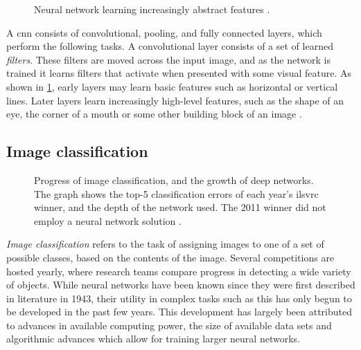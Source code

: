 \documentclass[\rootfolder/main.tex]{subfiles}
\begin{document}
\begin{figure}
    \caption[Neural network learning increasingly abstract features.]{Neural network learning increasingly abstract features \cite{Brown2015}.\label{fig:abstract-features}}
\end{figure}

A \acrshort{cnn} consists of convolutional, pooling, and fully connected layers, which perform the following tasks.
A convolutional layer consists of a set of learned \emph{filters}.
These filters are moved across the input image, and as the network is trained it learns filters that activate when presented with some visual feature.
As shown in \cref{fig:abstract-features}, early layers may learn basic features such as horizontal or vertical lines.
Later layers learn increasingly high-level features, such as the shape of an eye, the corner of a mouth or some other building block of an image \cite{Brown2015}.


\subsection{Image classification}

\begin{figure}
    \caption[The influence of deep learning on image classification error rates.]%
            {Progress of image classification, and the growth of deep networks. %
                The graph shows the top-5 classification errors of each year's \acrshort{ilsvrc} winner, and the depth of the network used. %
             The 2011 winner did not employ a neural network solution
             \cite{Krizhevsky2012}\cite{Zeiler2013}\cite{Szegedy2014}\cite{He2016}.\label{fig:ilsvrc}}
\end{figure}

\emph{Image classification} refers to the task of assigning images to one of a set of possible classes, based on the contents of the image.
Several competitions are hosted yearly, where research teams compare progress in detecting a wide variety of objects.
While neural networks have been known since they were first described in literature in 1943\cite{Mitchell1997}\cite{Mcculloch1943}, their utility in complex tasks such as this has only begun to be developed in the past few years.
This development has largely been attributed to advances in available computing power, the size of available data sets and algorithmic advances which allow for training larger neural networks.
\end{document}
